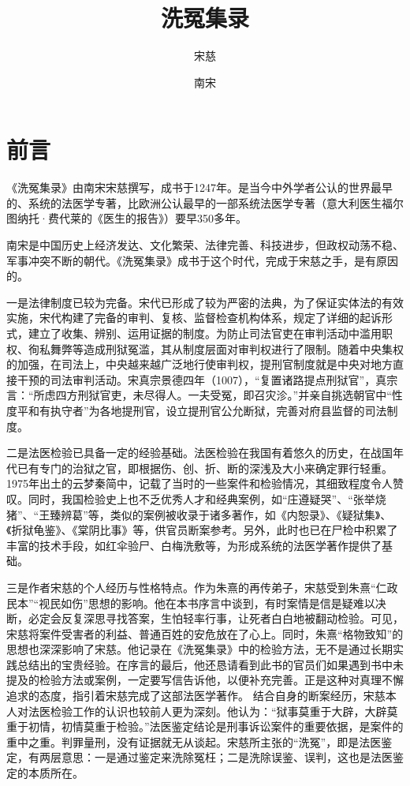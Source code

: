 \documentclass[12pt,UTF8]{ctexbook}
\title{\heiti\zihao{0} 洗冤集录}
\author{宋慈}
\date{南宋}
\begin{document}
\maketitle
\tableofcontents

\frontmatter

\chapter{前言}

《洗冤集录》由南宋宋慈撰写，成书于1247年。是当今中外学者公认的世界最早的、系统的法医学专著，比欧洲公认最早的一部系统法医学专著（意大利医生福尔图纳托·费代莱的《医生的报告》）要早350多年。

南宋是中国历史上经济发达、文化繁荣、法律完善、科技进步，但政权动荡不稳、军事冲突不断的朝代。《洗冤集录》成书于这个时代，完成于宋慈之手，是有原因的。

一是法律制度已较为完备。宋代已形成了较为严密的法典，为了保证实体法的有效实施，宋代构建了完备的审判、复核、监督检查机构体系，规定了详细的起诉形式，建立了收集、辨别、运用证据的制度。为防止司法官吏在审判活动中滥用职权、徇私舞弊等造成刑狱冤滥，其从制度层面对审判权进行了限制。随着中央集权的加强，在司法上，中央越来越广泛地行使审判权，提刑官制度就是中央对地方直接干预的司法审判活动。宋真宗景德四年（1007），“复置诸路提点刑狱官”，真宗言：“所虑四方刑狱官吏，未尽得人。一夫受冤，即召灾沴。”并亲自挑选朝官中“性度平和有执守者”为各地提刑官，设立提刑官公允断狱，完善对府县监督的司法制度。

二是法医检验已具备一定的经验基础。法医检验在我国有着悠久的历史，在战国年代已有专门的治狱之官，即根据伤、创、折、断的深浅及大小来确定罪行轻重。1975年出土的云梦秦简中，记载了当时的一些案件和检验情况，其细致程度令人赞叹。同时，我国检验史上也不乏优秀人才和经典案例，如“庄遵疑哭”、“张举烧猪”、“王臻辨葛”等，类似的案例被收录于诸多著作，如《内恕录》、《疑狱集》、《折狱龟鉴》、《棠阴比事》等，供官员断案参考。另外，此时也已在尸检中积累了丰富的技术手段，如红伞验尸、白梅洗敷等，为形成系统的法医学著作提供了基础。

三是作者宋慈的个人经历与性格特点。作为朱熹的再传弟子，宋慈受到朱熹“仁政民本”“视民如伤”思想的影响。他在本书序言中谈到，有时案情是信是疑难以决断，必定会反复深思寻找答案，生怕轻率行事，让死者白白地被翻动检验。可见，宋慈将案件受害者的利益、普通百姓的安危放在了心上。同时，朱熹“格物致知”的思想也深深影响了宋慈。他记录在《洗冤集录》中的检验方法，无不是通过长期实践总结出的宝贵经验。在序言的最后，他还恳请看到此书的官员们如果遇到书中未提及的检验方法或案例，一定要写信告诉他，以便补充完善。正是这种对真理不懈追求的态度，指引着宋慈完成了这部法医学著作。
结合自身的断案经历，宋慈本人对法医检验工作的认识也较前人更为深刻。他认为：“狱事莫重于大辟，大辟莫重于初情，初情莫重于检验。”法医鉴定结论是刑事诉讼案件的重要依据，是案件的重中之重。判罪量刑，没有证据就无从谈起。宋慈所主张的“洗冤”，即是法医鉴定，有两层意思：一是通过鉴定来洗除冤枉；二是洗除误鉴、误判，这也是法医鉴定的本质所在。
\end{document}
